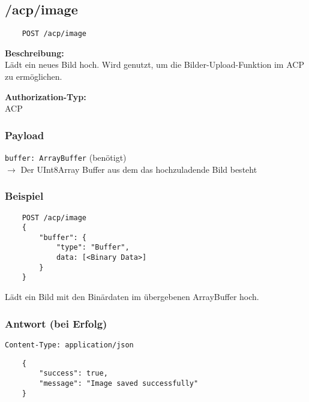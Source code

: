 \subsection{/acp/image}

\begin{lstlisting}
    POST /acp/image
\end{lstlisting}

\textbf{Beschreibung:} \\
Lädt ein neues Bild hoch. Wird genutzt, um die Bilder-Upload-Funktion im ACP zu ermöglichen.

\textbf{Authorization-Typ:} \\
ACP

\subsubsection{Payload}

\lstinline{buffer: ArrayBuffer} (benötigt) \\
$\rightarrow$ Der UInt8Array Buffer aus dem das hochzuladende Bild besteht

\subsubsection{Beispiel}

\begin{lstlisting}
    POST /acp/image
    {
        "buffer": {
            "type": "Buffer",
            data: [<Binary Data>]
        } 
    }
\end{lstlisting}

Lädt ein Bild mit den Binärdaten im übergebenen ArrayBuffer hoch.

\subsubsection{Antwort (bei Erfolg)}

\lstinline{Content-Type: application/json}
\begin{lstlisting}
    {
        "success": true, 
        "message": "Image saved successfully"
    }
\end{lstlisting}
